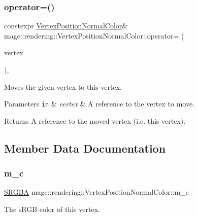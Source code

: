 \subsubsection{\texorpdfstring{operator=()}{operator=()}\hspace{0.1cm}{\footnotesize\ttfamily [2/2]}}
{\footnotesize\ttfamily constexpr \hyperlink{structmage_1_1rendering_1_1_vertex_position_normal_color}{Vertex\+Position\+Normal\+Color}\& mage\+::rendering\+::\+Vertex\+Position\+Normal\+Color\+::operator= (\begin{DoxyParamCaption}\item[{\hyperlink{structmage_1_1rendering_1_1_vertex_position_normal_color}{Vertex\+Position\+Normal\+Color} \&\&}]{vertex }\end{DoxyParamCaption})\hspace{0.3cm}{\ttfamily [default]}, {\ttfamily [noexcept]}}

Moves the given vertex to this vertex.


\begin{DoxyParams}[1]{Parameters}
\mbox{\tt in}  & {\em vertex} & A reference to the vertex to move. \\
\hline
\end{DoxyParams}
\begin{DoxyReturn}{Returns}
A reference to the moved vertex (i.\+e. this vertex). 
\end{DoxyReturn}


\subsection{Member Data Documentation}
\hypertarget{structmage_1_1rendering_1_1_vertex_position_normal_color_ac2ae96122976e9f8cfa7ba7e50cedcd5}{}\label{structmage_1_1rendering_1_1_vertex_position_normal_color_ac2ae96122976e9f8cfa7ba7e50cedcd5} 
\subsubsection{\texorpdfstring{m\+\_\+c}{m\_c}}
{\footnotesize\ttfamily \hyperlink{structmage_1_1_s_r_g_b_a}{S\+R\+G\+BA} mage\+::rendering\+::\+Vertex\+Position\+Normal\+Color\+::m\+\_\+c}

The s\+R\+GB color of this vertex. \hypertarget{structmage_1_1rendering_1_1_vertex_position_normal_color_abf35d5cb0057f76dbd6f153ee0f412f4}{}\label{structmage_1_1rendering_1_1_vertex_position_normal_color_abf35d5cb0057f76dbd6f153ee0f412f4} 

